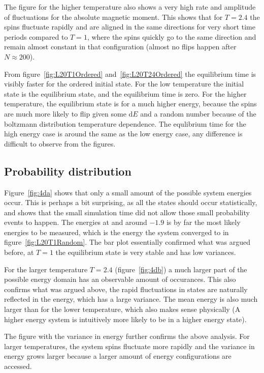 \documentclass[aps,reprint]{revtex4-1}
\begin{document}
The figure for the higher temperature also shows a very high rate and amplitude
of fluctuations for the absolute magnetic moment. This shows that for $T = 2.4$
the spins fluctuate rapidly and are aligned in the same directions for very short
time periods compared to $T = 1$, where the spins quickly go to the same direction
and remain almost constant in that configuration (almost no flips happen after
$N \approx 200$).

From figure~\ref{fig:L20T1Ordered} and~\ref{fig:L20T24Ordered} the equilibrium
time is visibly faster for the ordered initial state. For the low temperature
the initial state is the equilibrium state, and the equilibrium time is zero.
For the higher temperature, the equilibrium state is for a much higher energy,
because the spins are much more likely to flip given some d$E$ and a random
number because of the boltzmann distribution temperature dependence. The equlibrium
time for the high energy case is around the same as the low energy case, any difference
is difficult to observe from the figures.

\subsection{Probability distribution}
Figure~\ref{fig:4da} shows that only a small amount of the possible system energies occur.
This is perhaps a bit surprising, as all the states should occur statistically,
and shows that the small simulation time did not allow those small probability events to
happen. The energies at and around $-1.9$ is by far the most likely energies to be measured,
which is the energy the system converged to in figure~\ref{fig:L20T1Random}. The
bar plot essentially confirmed what was argued before, at $T = 1$ the equilibrium state
is very stable and has low variances.

For the larger temperature $T = 2.4$ (figure~\ref{fig:4db}) a much larger part of
the possible energy domain has an observable amount of occurances. This also confirms
what was argued above, the rapid fluctuations in states are naturally reflected in the
energy, which has a large variance. The mean energy is also much larger than for the lower
temperature, which also makes sense physically (A higher energy system is intuitively
more likely to be in a higher energy state).

The figure with the variance in energy further confirms the above analysis. For
larger temperatures, the system spins fluctuate more rapidly and the variance in energy
grows larger because a larger amount of energy configurations are accessed.
\end{document}
